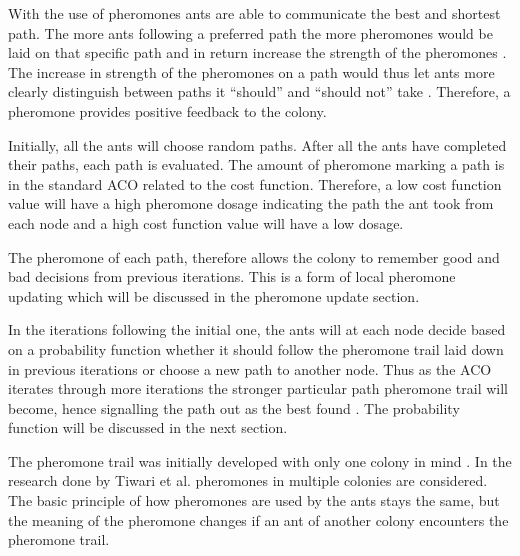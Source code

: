 With the use of pheromones ants are able to communicate the best and shortest path\cite{AntQAO,AntsAndStigmergy,CompuIntelligenceIntro}. The more ants following a preferred path the more pheromones would be laid on that specific path and in return increase the strength of the pheromones \cite{ImpACOComplex}. The increase in strength of the pheromones on a path would thus let ants more clearly distinguish between paths it “should” and “should not” take \cite{ImpACOComplex}. Therefore, a pheromone provides positive feedback to the colony\cite{AntQAO,AntsAndStigmergy,CompuIntelligenceIntro}.

Initially, all the ants will choose random paths\cite{AntQAO,AntsAndStigmergy,CompuIntelligenceIntro}. After all the ants have completed their paths, each path is evaluated\cite{CompuIntelligenceIntro}. The amount of pheromone marking a path is in the standard ACO related to the cost function\cite{AntQAO,AntsAndStigmergy,CompuIntelligenceIntro}. Therefore, a low cost function value will have a high pheromone dosage indicating the path the ant took from each node and a high cost function value will have a low dosage\cite{CompuIntelligenceIntro}. 

The pheromone of each path, therefore allows the colony to remember good and bad decisions from previous iterations\cite{CompuIntelligenceIntro}. This is a form of local pheromone updating \label{def:localpheromoneupdate}which will be discussed in the pheromone update section. 

In the iterations following the initial one, the ants will at each node decide based on a probability function whether it should follow the pheromone trail laid down in previous iterations or choose a new path to another node\cite{AntQAO,AntsAndStigmergy,CompuIntelligenceIntro}. Thus as the ACO iterates through more iterations the stronger particular path pheromone trail will become, hence signalling the path out as the best found \cite{CompuIntelligenceIntro}. The probability function will be discussed in the next section.

The pheromone trail was initially developed with only one colony in mind \cite{CompuIntelligenceIntro}. In the research done by Tiwari et al.\cite{ACOLargeProblem} pheromones in multiple colonies are considered. The basic principle of how pheromones are used by the ants stays the same, but the meaning of the pheromone changes if an ant of another colony encounters the pheromone trail\cite{AntQAO,AntsAndStigmergy,CompuIntelligenceIntro}. 

